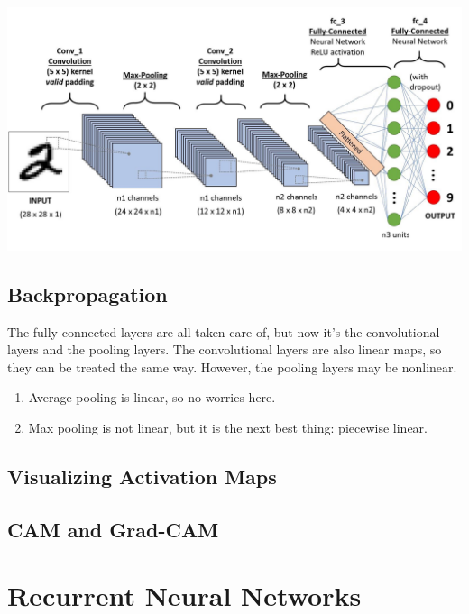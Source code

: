 \documentclass{article}
\begin{document}
    \begin{center}
        \includegraphics[scale=0.25]{img/03_CNN/CNN_architecture.jpeg}
    \end{center}

    \subsection{Backpropagation}

    The fully connected layers are all taken care of, but now it's the convolutional layers and the pooling layers. The convolutional layers are also linear maps, so they can be treated the same way. However, the pooling layers may be nonlinear. 
    \begin{enumerate}
      \item Average pooling is linear, so no worries here. 
      \item Max pooling is not linear, but it is the next best thing: piecewise linear. 
    \end{enumerate}

  \subsection{Visualizing Activation Maps}

    \subsection{CAM and Grad-CAM}

\section{Recurrent Neural Networks}
\end{document}
